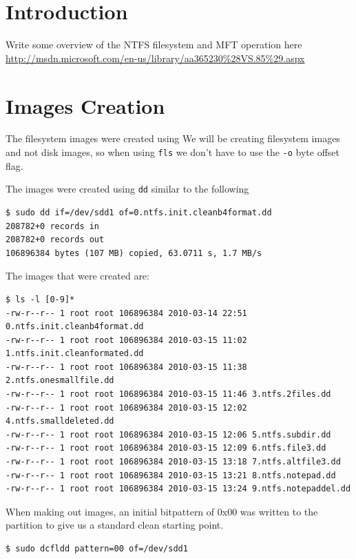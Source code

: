 \documentclass[a4paper,
    11pt,
    normalheadings,
    parindent,
    UKenglish,
    abstracton,
    ]{scrartcl}
\title{\mytitle{}}
\author{
    cand. Dipl. Inf. Tobias Müller <\href{mailto:muellet2@computing.dcu.ie?subject=ss10-forensic-lab01}{muellet2@}>, 59212333 \and
    BSc. Anthony Walters <\href{mailto:waltera3@computing.dcu.ie?subject=ss10-forensic-lab01}{waltera3@}>, 59213102
    }
\date{\today}
\begin{document}
\maketitle


\section{Introduction}
Write some overview of the NTFS filesystem and MFT operation here
\url{http://msdn.microsoft.com/en-us/library/aa365230%28VS.85%29.aspx}


\section{Images Creation}
The filesystem images were created using
We will be creating filesystem images and not disk images, so when using \texttt{fls} we don't have to use the \texttt{-o} byte offset flag.

The images were created using \texttt{dd} similar to the following
\begin{verbatim}
$ sudo dd if=/dev/sdd1 of=0.ntfs.init.cleanb4format.dd
208782+0 records in
208782+0 records out
106896384 bytes (107 MB) copied, 63.0711 s, 1.7 MB/s
\end{verbatim}

The images that were created are:
\begin{verbatim}
$ ls -l [0-9]*
-rw-r--r-- 1 root root 106896384 2010-03-14 22:51 0.ntfs.init.cleanb4format.dd
-rw-r--r-- 1 root root 106896384 2010-03-15 11:02 1.ntfs.init.cleanformated.dd
-rw-r--r-- 1 root root 106896384 2010-03-15 11:38 2.ntfs.onesmallfile.dd
-rw-r--r-- 1 root root 106896384 2010-03-15 11:46 3.ntfs.2files.dd
-rw-r--r-- 1 root root 106896384 2010-03-15 12:02 4.ntfs.smalldeleted.dd
-rw-r--r-- 1 root root 106896384 2010-03-15 12:06 5.ntfs.subdir.dd
-rw-r--r-- 1 root root 106896384 2010-03-15 12:09 6.ntfs.file3.dd
-rw-r--r-- 1 root root 106896384 2010-03-15 13:18 7.ntfs.altfile3.dd
-rw-r--r-- 1 root root 106896384 2010-03-15 13:21 8.ntfs.notepad.dd
-rw-r--r-- 1 root root 106896384 2010-03-15 13:24 9.ntfs.notepaddel.dd
\end{verbatim}

When making out images, an initial bitpattern of 0x00 was written to the partition to give us a standard clean starting point.

\begin{verbatim}
$ sudo dcfldd pattern=00 of=/dev/sdd1
\end{verbatim}
\end{document}
